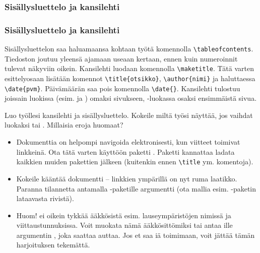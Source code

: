 \subsubsection{Sisällysluettelo ja kansilehti}
\begin{fframe}
    \frametitle{Sisällysluettelo ja kansilehti}
    Sisällysluettelon saa haluamaansa kohtaan työtä komennolla \lstinline-\tableofcontents-. Tiedoston joutuu yleensä ajamaan useaan kertaan, ennen kuin numeroinnit tulevat näkyviin oikein.
    \pause
    \vaihto
    Kansilehti luodaan komennolla \lstinline-\maketitle-. Tätä varten esittelyosaan lisätään komennot \lstinline-\title{otsikko}-, \lstinline-\author{nimi}- ja haluttaessa \lstinline-\date{pvm}-. Päivämäärän saa pois komennolla \lstinline-\date{}-.
    \vaihto
    Kansilehti tulostuu joissain luokissa (esim.  ja ) omaksi sivukseen, -luokassa osaksi ensimmäistä sivua.
\end{fframe}

\begin{fframe}
    \begin{harj}
        Luo työllesi kansilehti ja sisällysluettelo. Kokeile miltä työsi näyttää, jos vaihdat luokaksi  tai . Millaisia eroja huomaat? 
    \end{harj}
    \begin{harj}
        \begin{itemize}
            \item Dokumenttia on helpompi navigoida elektronisesti, kun viitteet toimivat linkkeinä. Ota tätä varten käyttöön paketti . Paketti kannattaa ladata kaikkien muiden pakettien jälkeen (kuitenkin ennen \lstinline-\title- ym. komentoja).
            \item Kokeile kääntää dokumentti -- linkkien ympärillä on nyt ruma laatikko. Paranna tilannetta antamalla -paketille argumentti  (ota mallia esim. -paketin lataavasta rivistä).
            \item {\small Huom!  ei oikein tykkää ääkkösistä esim. lauseympäristöjen nimissä ja viittaustunnuksissa. Voit muokata nämä ääkkösittömiksi tai antaa ille argumentin , joka saattaa auttaa. Jos et saa iä toimimaan, voit jättää tämän harjoituksen tekemättä.}
        \end{itemize}
    \end{harj}
\end{fframe}

